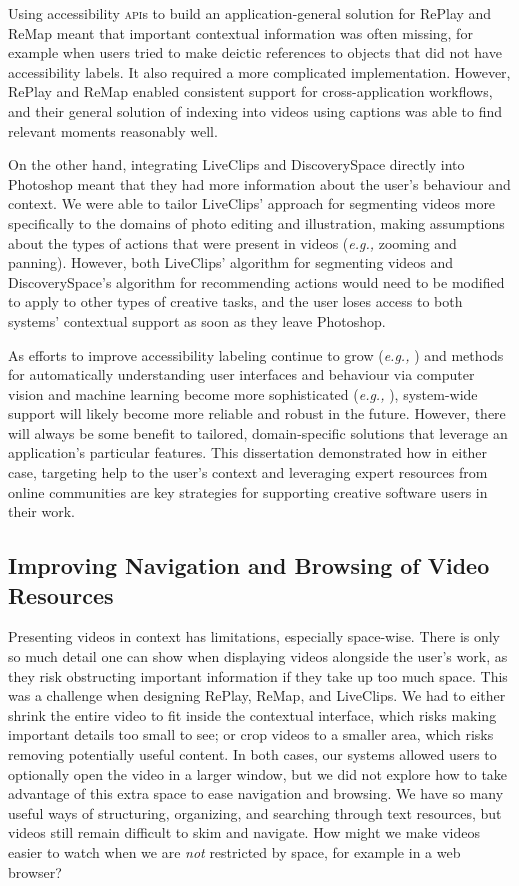 Using accessibility \textsc{api}s to build an application-general solution for RePlay and ReMap meant that important contextual information was often missing, for example when users tried to make deictic references to objects that did not have accessibility labels. It also required a more complicated implementation. However, RePlay and ReMap enabled consistent support for cross-application workflows, and their general solution of indexing into videos using captions was able to find relevant moments reasonably well.

On the other hand, integrating LiveClips and Discovery\-Space directly into Photoshop meant that they had more information about the user's behaviour and context. We were able to tailor LiveClips' approach for segmenting videos more specifically to the domains of photo editing and illustration, making assumptions about the types of actions that were present in videos (\textit{e.g.,} zooming and panning). However, both LiveClips' algorithm for segmenting videos and Discovery\-Space's algorithm for recommending actions would need to be modified to apply to other types of creative tasks, and the user loses access to both systems' contextual support as soon as they leave Photoshop.

As efforts to improve accessibility labeling continue to grow (\textit{e.g.,} \cite{Guo2016, Guo2019StateLens}) and methods for automatically understanding user interfaces and behaviour via computer vision and machine learning become more sophisticated (\textit{e.g.,} \cite{Liu2020, Dixon2010}), system-wide support will likely become more reliable and robust in the future. However, there will always be some benefit to tailored, domain-specific solutions that leverage an application's particular features. This dissertation demonstrated how in either case, targeting help to the user's context and leveraging expert resources from online communities are key strategies for supporting creative software users in their work.

\subsection{Improving Navigation and Browsing of Video Resources}
Presenting videos in context has limitations, especially space-wise. There is only so much detail one can show when displaying videos alongside the user's work, as they risk obstructing important information if they take up too much space. This was a challenge when designing RePlay, ReMap, and LiveClips. We had to either shrink the entire video to fit inside the contextual interface, which risks making important details too small to see; or crop videos to a smaller area, which risks removing potentially useful content. In both cases, our systems allowed users to optionally open the video in a larger window, but we did not explore how to take advantage of this extra space to ease navigation and browsing. We have so many useful ways of structuring, organizing, and searching through text resources, but videos still remain difficult to skim and navigate. How might we make videos easier to watch when we are \textit{not} restricted by space, for example in a web browser? 

